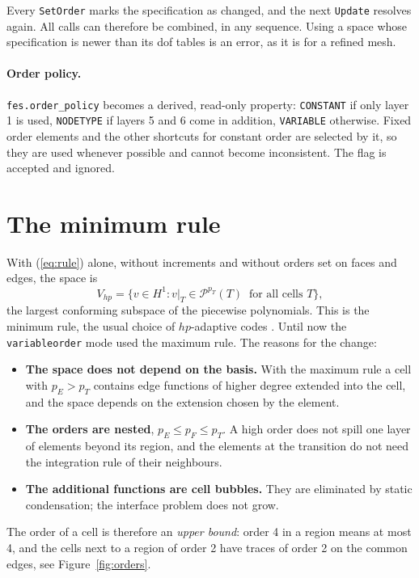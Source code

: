 \documentclass[10pt,a4paper]{article}
\newcommand{\code}[1]{\texttt{#1}}
\newcommand{\PP}{\mathcal{P}}
\begin{document}
Every \code{SetOrder} marks the specification as changed, and the next \code{Update} resolves again. All calls can therefore be combined, in any sequence. Using a space whose specification is newer than its dof tables is an error, as it is for a refined mesh.

\paragraph{Order policy.} \code{fes.order\_policy} becomes a derived, read-only property: \code{CONSTANT} if only layer 1 is used, \code{NODETYPE} if layers 5 and 6 come in addition, \code{VARIABLE} otherwise. Fixed order elements and the other shortcuts for constant order are selected by it, so they are used whenever possible and cannot become inconsistent. The flag is accepted and ignored.

\section{The minimum rule}

With (\ref{eq:rule}) alone, without increments and without orders set on faces and edges, the space is
\[
V_{hp} = \{ v \in H^1 : v|_T \in \PP^{p_T}(T) \ \text{ for all cells } T \},
\]
the largest conforming subspace of the piecewise polynomials. This is the minimum rule, the usual choice of $hp$-adaptive codes \cite{d06,mm14}. Until now the \code{variableorder} mode used the maximum rule. The reasons for the change:
\begin{itemize}\setlength\itemsep{1pt}
\item \textbf{The space does not depend on the basis.} With the maximum rule a cell with $p_E > p_T$ contains edge functions of higher degree extended into the cell, and the space depends on the extension chosen by the element.
\item \textbf{The orders are nested}, $p_E \le p_F \le p_T$. A high order does not spill one layer of elements beyond its region, and the elements at the transition do not need the integration rule of their neighbours.
\item \textbf{The additional functions are cell bubbles.} They are eliminated by static condensation; the interface problem does not grow.
\end{itemize}
The order of a cell is therefore an \emph{upper bound}: order 4 in a region means at most 4, and the cells next to a region of order 2 have traces of order 2 on the common edges, see Figure~\ref{fig:orders}.
\end{document}
